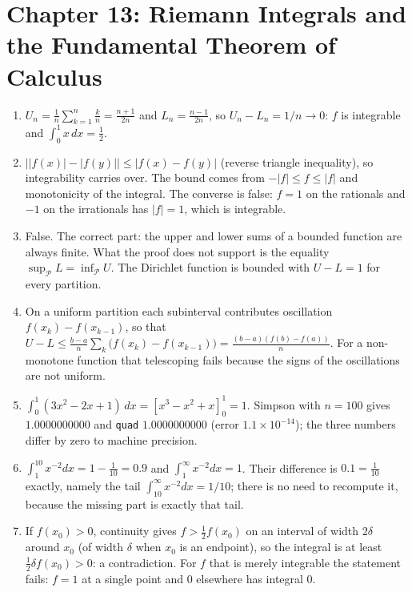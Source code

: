 \section*{Chapter 13: Riemann Integrals and the Fundamental Theorem of Calculus}
\begin{enumerate}[label=\textbf{13.\arabic*}]
  \item $U_{n}=\frac1n\sum_{k=1}^{n}\frac kn=\frac{n+1}{2n}$ and
        $L_{n}=\frac{n-1}{2n}$, so $U_{n}-L_{n}=1/n\to0$: $f$ is integrable
        and $\int_{0}^{1}x\,dx=\tfrac12$.

  \item $\bigl\lvert\lvert f(x)\rvert-\lvert f(y)\rvert\bigr\rvert
        \le\lvert f(x)-f(y)\rvert$ (reverse triangle inequality), so
        integrability carries over. The bound comes from $-\lvert f\rvert\le f\le\lvert f\rvert$
        and monotonicity of the integral. The converse is false: $f=1$ on the rationals and
        $-1$ on the irrationals has $\lvert f\rvert=1$, which is integrable.

  \item False. The correct part: the upper and lower sums of a bounded function are always
        finite. What the proof does not support is the equality
        $\sup_{\mathcal{P}}L=\inf_{\mathcal{P}}U$. The Dirichlet function is bounded
        with $U-L=1$ for every partition.

  \item On a uniform partition each subinterval contributes oscillation
        $f(x_{k})-f(x_{k-1})$, so that
        $U-L\le\frac{b-a}{n}\sum_{k}\bigl(f(x_{k})-f(x_{k-1})\bigr)
        =\frac{(b-a)(f(b)-f(a))}{n}$. For a non-monotone function that telescoping fails
        because the signs of the oscillations are not uniform.

  \item $\int_{0}^{1}(3x^{2}-2x+1)\,dx=[x^{3}-x^{2}+x]_{0}^{1}=1$. Simpson
        with $n=100$ gives $1.0000000000$ and \texttt{quad} $1.0000000000$
        (error $1.1\times10^{-14}$); the three numbers differ by zero to machine
        precision.

  \item $\int_{1}^{10}x^{-2}dx=1-\tfrac1{10}=0.9$ and
        $\int_{1}^{\infty}x^{-2}dx=1$. Their difference is $0.1=\tfrac1{10}$ exactly,
        namely the tail $\int_{10}^{\infty}x^{-2}dx=1/10$; there is no need to recompute it,
        because the missing part is exactly that tail.

  \item If $f(x_{0})>0$, continuity gives $f>\tfrac12f(x_{0})$ on an interval of
        width $2\delta$ around $x_{0}$ (of width $\delta$ when $x_{0}$ is an
        endpoint), so the integral is at least
        $\tfrac12\delta f(x_{0})>0$: a contradiction. For $f$ that is merely integrable
        the statement fails: $f=1$ at a single point and $0$ elsewhere has integral
        $0$.


\end{enumerate}
